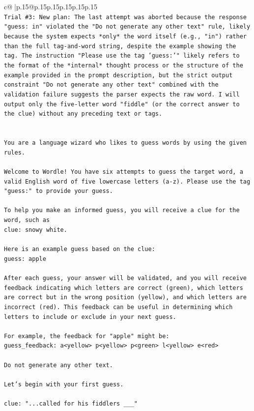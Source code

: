 \documentclass{article}
\begin{document}
{\begin{supertabular}{c@{$\;$}|p{.15\linewidth}@{}p{.15\linewidth}p{.15\linewidth}p{.15\linewidth}p{.15\linewidth}p{.15\linewidth}}
{{{\\ 
\texttt{Trial \#3: New plan: The last attempt was aborted because the response "guess: in" violated the "Do not generate any other text" rule, likely because the system expects *only* the word itself (e.g., "in") rather than the full tag{-}and{-}word string, despite the example showing the tag. The instruction "Please use the tag 'guess:'" likely refers to the format of the *internal* thought process or the structure of the example provided in the prompt description, but the strict output constraint "Do not generate any other text" combined with the validation failure suggests the parser expects the raw word. I will output only the five{-}letter word "fiddle" (or the correct answer to the clue) without any preceding text or tags.} \\
\\ 
\\ 
\texttt{You are a language wizard who likes to guess words by using the given rules.} \\
\\ 
\texttt{Welcome to Wordle! You have six attempts to guess the target word, a valid English word of five lowercase letters (a{-}z). Please use the tag "guess:" to provide your guess.} \\
\\ 
\texttt{To help you make an informed guess, you will receive a clue for the word, such as} \\
\texttt{clue: snowy white.} \\
\\ 
\texttt{Here is an example guess based on the clue: } \\
\texttt{guess: apple} \\
\\ 
\texttt{After each guess, your answer will be validated, and you will receive feedback indicating which letters are correct (green), which letters are correct but in the wrong position (yellow), and which letters are incorrect (red). This feedback can be useful in determining which letters to include or exclude in your next guess.} \\
\\ 
\texttt{For example, the feedback for "apple" might be:} \\
\texttt{guess\_feedback: a<yellow> p<yellow> p<green> l<yellow> e<red>} \\
\\ 
\texttt{Do not generate any other text.} \\
\\ 
\texttt{Let's begin with your first guess.} \\
\\ 
\texttt{clue: "...called for his fiddlers \_\_\_"} \\
            }
        }
    }
     \\ \\


\end{supertabular}}
\end{document}
